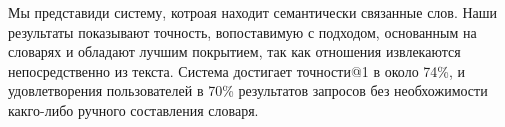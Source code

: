 \documentclass[a4paper,10pt,twoside]{article}
\begin{document}
Мы представиди систему, котроая находит семантически связанные слов. Наши результаты показывают точность, вопоставимую с подходом, основанным на словарях и обладают лучшим покрытием, так как отношения извлекаются непосредственно из текста. Система достигает точности@1 в около 74\%, и удовлетворения пользователей в 70\% результатов запросов без необхожимости какго-либо ручного составления словаря.




\end{document}
